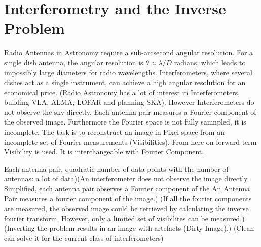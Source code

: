 \section{Interferometry and the Inverse Problem}\label{intro}
Radio Antennas in Astronomy require a sub-arcsecond angular resolution. For a single dish antenna, the angular resolution is $ \theta \approx \lambda / D$ radians, which leads to impossibly large diameters for radio wavelengths. Interferometers, where several dishes act as a single instrument, can achieve a high angular resolution for an economical price.  (Radio Astronomy has a lot of interest in Interferometers, building VLA, ALMA, LOFAR and planning SKA). However Interferometers do not observe the sky directly. Each antenna pair measures a Fourier component of the observed image. Furthermore the Fourier space is not fully samnpled, it is incomplete. The task is to reconstruct an image in Pixel space from an incomplete set of Fourier measurements (Visibilities). From here on forward term Visibility is used. It is interchangeable with Fourier Component.

Each antenna pair, quadratic number of data points with the number of antennas: a lot of data)(An interferometer does not observe the image directly. Simplified, each antenna pair observes a Fourier component of the An Antenna Pair measures a fourier component of the image.) (If all the fourier components are measured, the observed image could be retrieved by calculating the inverse fourier transform. However, only a limited set of visibilites can be measured.)(Inverting the problem results in an image with artefacts (Dirty Image).) (Clean can solve it for the current class of interferometers)




